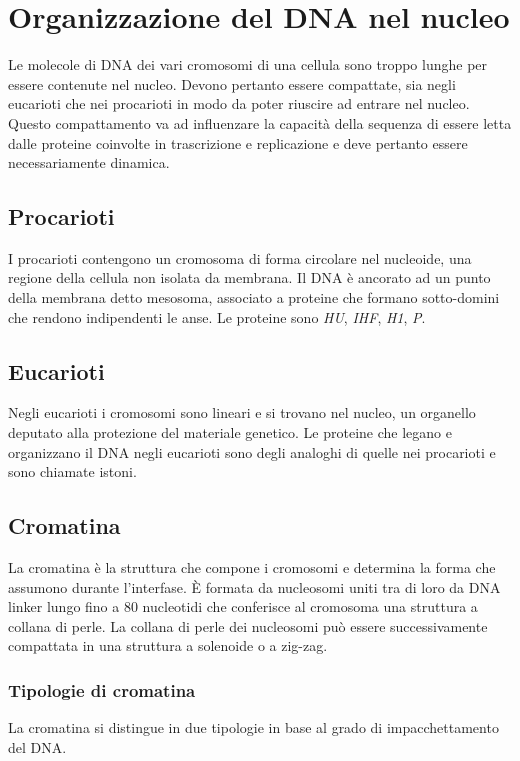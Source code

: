 \section{Organizzazione del DNA nel nucleo}
Le molecole di DNA dei vari cromosomi di una cellula sono troppo lunghe per essere contenute nel nucleo.
Devono pertanto essere compattate, sia negli eucarioti che nei procarioti in modo da poter riuscire ad entrare nel nucleo.
Questo compattamento va ad influenzare la capacit\`a della sequenza di essere letta dalle proteine coinvolte in trascrizione e replicazione e deve pertanto essere necessariamente dinamica.

	\subsection{Procarioti}
	I procarioti contengono un cromosoma di forma circolare nel nucleoide, una regione della cellula non isolata da membrana.
	Il DNA \`e ancorato ad un punto della membrana detto mesosoma, associato a proteine che formano sotto-domini che rendono indipendenti le anse.
	Le proteine sono \emph{HU}, \emph{IHF}, \emph{H1}, \emph{P}.

	\subsection{Eucarioti}
	Negli eucarioti i cromosomi sono lineari e si trovano nel nucleo, un organello deputato alla protezione del materiale genetico.
	Le proteine che legano e organizzano il DNA negli eucarioti sono degli analoghi di quelle nei procarioti e sono chiamate istoni.
	
	\subsection{Cromatina}
	La cromatina \`e la struttura che compone i cromosomi e determina la forma che assumono durante l'interfase.
	\`E formata da nucleosomi uniti tra di loro da DNA linker lungo fino a $80$ nucleotidi che conferisce al cromosoma una struttura a collana di perle.
	La collana di perle dei nucleosomi pu\`o essere successivamente compattata in una struttura a solenoide o a zig-zag.

		\subsubsection{Tipologie di cromatina}
		La cromatina si distingue in due tipologie in base al grado di impacchettamento del DNA.

